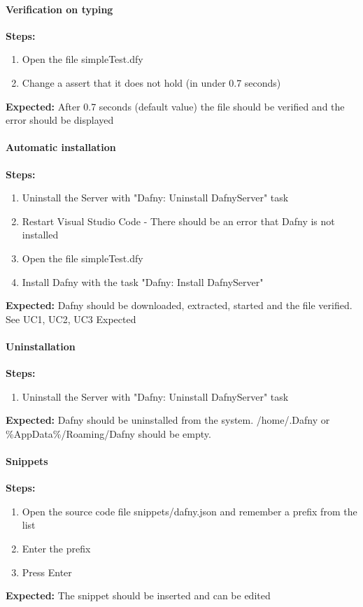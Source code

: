 \paragraph{Verification on typing}
\textbf{\newline Steps:}
\begin{enumerate}
	\item Open the file simpleTest.dfy
	\item Change a assert that it does not hold (in under 0.7 seconds)
\end{enumerate}
\textbf{\newline Expected:}
After 0.7 seconds (default value) the file should be verified and the error should be displayed 

\paragraph{Automatic installation}
\textbf{\newline Steps:}
\begin{enumerate}
	\item Uninstall the Server with "Dafny: Uninstall DafnyServer" task
	\item Restart Visual Studio Code - There should be an error that Dafny is not installed
	\item Open the file simpleTest.dfy
	\item Install Dafny with the task "Dafny: Install DafnyServer" 
\end{enumerate}
\textbf{\newline Expected:}
Dafny should be downloaded, extracted, started and the file verified. See UC1, UC2, UC3 Expected


\paragraph{Uninstallation}
\textbf{\newline Steps:}
\begin{enumerate}
	\item Uninstall the Server with "Dafny: Uninstall DafnyServer" task
\end{enumerate}
\textbf{\newline Expected:}
Dafny should be uninstalled from the system. /home/.Dafny or \%AppData\%/Roaming/Dafny should be empty.


\paragraph{Snippets}
\textbf{\newline Steps:}
\begin{enumerate}
	\item Open the source code file snippets/dafny.json and remember a prefix from the list
	\item Enter the prefix 
	\item Press Enter
\end{enumerate}
\textbf{\newline Expected:}
The snippet should be inserted and can be edited


